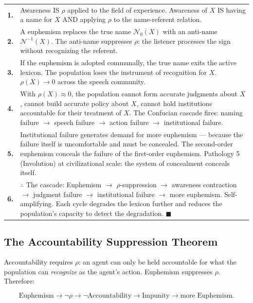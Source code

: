 \documentclass[11pt, oneside]{article}
\theoremstyle{definition}
\begin{document}
{\small
\noindent\begin{tabular}{r p{}}
\textbf{1.} & Awareness IS $\rho$ applied to the field of experience. Awareness of $X$ IS having a name for $X$ AND applying $\rho$ to the name-referent relation. \\[0.3em]
\textbf{2.} & A euphemism replaces the true name $\mathcal{N}_0(X)$ with an anti-name $\mathcal{N}^{-1}(X)$. The anti-name suppresses $\rho$: the listener processes the sign without recognizing the referent. \\[0.3em]
\textbf{3.} & If the euphemism is adopted communally, the true name exits the active lexicon. The population loses the instrument of recognition for $X$. $\rho(X) \to 0$ across the speech community. \\[0.3em]
\textbf{4.} & With $\rho(X) \approx 0$, the population cannot form accurate judgments about $X$, cannot build accurate policy about $X$, cannot hold institutions accountable for their treatment of $X$. The Confucian cascade fires: naming failure $\to$ speech failure $\to$ action failure $\to$ institutional failure. \\[0.3em]
\textbf{5.} & Institutional failure generates demand for more euphemism --- because the failure itself is uncomfortable and must be concealed. The second-order euphemism conceals the failure of the first-order euphemism. Pathology 5 (Involution) at civilizational scale: the system of concealment conceals itself. \\[0.3em]
\textbf{6.} & $\therefore$ The cascade: Euphemism $\to$ $\rho$-suppression $\to$ awareness contraction $\to$ judgment failure $\to$ institutional failure $\to$ more euphemism. Self-amplifying. Each cycle degrades the lexicon further and reduces the population's capacity to detect the degradation. \hfill $\blacksquare$ \\[0.3em]
\end{tabular}
}

\subsection{The Accountability Suppression Theorem}

Accountability requires $\rho$: an agent can only be held accountable for what the population can \textit{recognize} as the agent's action. Euphemism suppresses $\rho$. Therefore:

$$\boxed{\text{Euphemism} \to \neg\rho \to \neg\text{Accountability} \to \text{Impunity} \to \text{more Euphemism}.}$$
\end{document}
